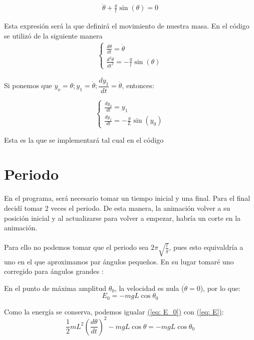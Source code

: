 \documentclass[11pt]{article}
\begin{document}
		\begin{align}
			\boxed{\ddot{\theta} + \frac{g}{l}\sin(\theta) = 0}
		\end{align}	
		
		Esta expresión será la que definirá el movimiento de nuestra masa. En el código se utilizó de la siguiente manera
		\begin{align*}
			\begin{cases}
				\frac{d\theta}{dt} = \dot{\theta}
				\\
				\frac{d^2\theta}{dt^2} = -\frac{g}{l}\sin(\theta)
			\end{cases}
		\end{align*}
		
		Si ponemos que $y_o = \theta ; y_1 = \dot{\theta} ; \dfrac{dy_1}{dt} = \ddot{\theta}$, entonces:
		
		\begin{equation}
			\boxed{
			\begin{cases}
				\frac{dy_0}{dt} = y_1 
				\\
				\frac{dy_1}{dt} = -\frac{g}{L} \sin(y_0)
			\end{cases}
			}	
		\end{equation}
		
		Esta es la que se implementará tal cual en el código
		
		
		\section{Periodo}
		En el programa, será necesario tomar un tiempo inicial y una final. Para el final decidí tomar 2 veces el periodo. De esta manera, la animación volver a su posición inicial y al actualizarse para volver a empezar, habría un corte en la animación.\\
		\\
		Para ello no podemos tomar que el periodo sea $2\pi\sqrt{\frac{l}{g}}$, pues esto equivaldría a uno en el que aproximamos par ángulos pequeños. En su lugar tomaré uno corregido para ángulos grandes \cite{marion2014dinamica}:
		
		En el punto de máxima amplitud $\theta_0$, la velocidad es nula ($\dot{\theta} = 0$), por lo que:
		\begin{equation}
			E_0 = -mgL\cos\theta_0
			\label{eq: E_0}
		\end{equation}
		
		Como la energía se conserva, podemos igualar \hyperref[eq: E_0]{(\ref{eq: E_0})} con \hyperref[eq: E]{(\ref{eq: E})}:
		\begin{equation*}
			\frac{1}{2} m L^2 \left( \frac{d\theta}{dt} \right)^2 - mgL\cos\theta = -mgL\cos\theta_0
		\end{equation*}
		
\end{document}
